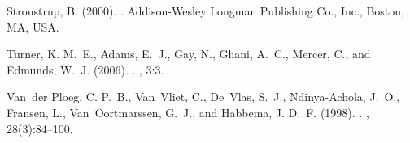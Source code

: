 \documentclass[11pt]{article}
\begin{document}
\begin{thebibliography}{}
Stroustrup, B. (2000).
.
\newblock Addison-Wesley Longman Publishing Co., Inc., Boston, MA, USA.

Turner, K. M.~E., Adams, E.~J., Gay, N., Ghani, A.~C., Mercer, C., and Edmunds,
W.~J. (2006).
.
, 3:3.

Van~der Ploeg, C. P.~B., Van~Vliet, C., De~Vlas, S.~J., Ndinya-Achola, J.~O.,
Fransen, L., Van~Oortmarssen, G.~J., and Habbema, J. D.~F. (1998).
.
, 28(3):84--100.

\end{thebibliography}
\end{document}
